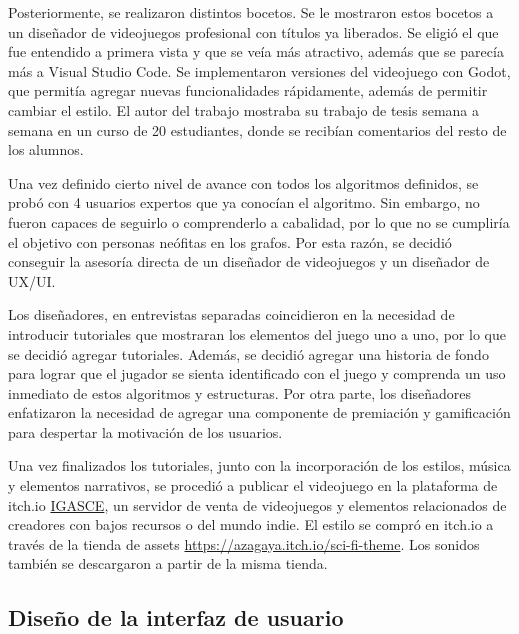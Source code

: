 
Posteriormente, se realizaron distintos bocetos. Se le mostraron estos bocetos a un diseñador de videojuegos profesional con títulos ya liberados. Se eligió el que fue entendido a primera vista y que se veía más atractivo, además que se parecía más a Visual Studio Code. Se implementaron versiones del videojuego con Godot, que permitía agregar nuevas funcionalidades rápidamente, además de permitir cambiar el estilo. El autor del trabajo mostraba su trabajo de tesis semana a semana en un curso de 20 estudiantes, donde se recibían comentarios del resto de los alumnos.

Una vez definido cierto nivel de avance con todos los algoritmos definidos, se probó con 4 usuarios expertos que ya conocían el algoritmo. Sin embargo, no fueron capaces de seguirlo o comprenderlo a cabalidad, por lo que no se cumpliría el objetivo con personas neófitas en los grafos. Por esta razón, se decidió conseguir la asesoría directa de un diseñador de videojuegos y un diseñador de UX/UI.

Los diseñadores, en entrevistas separadas coincidieron en la necesidad de introducir tutoriales que mostraran los elementos del juego uno a uno, por lo que se decidió agregar tutoriales. Además, se decidió agregar una historia de fondo para lograr que el jugador se sienta identificado con el juego y comprenda un uso inmediato de estos algoritmos y estructuras. Por otra parte, los diseñadores enfatizaron la necesidad de agregar una componente de premiación y gamificación para despertar la motivación de los usuarios.

Una vez finalizados los tutoriales, junto con la incorporación de los estilos, música y elementos narrativos, se procedió a publicar el videojuego en la plataforma de itch.io \href{https://alasaltum.itch.io/igasce}{IGASCE}, un servidor de venta de videojuegos y elementos relacionados de creadores con bajos recursos o del mundo indie. El estilo se compró en itch.io a través de la tienda de assets \url{https://azagaya.itch.io/sci-fi-theme}. Los sonidos también se descargaron a partir de la misma tienda.


\subsection{Diseño de la interfaz de usuario}

